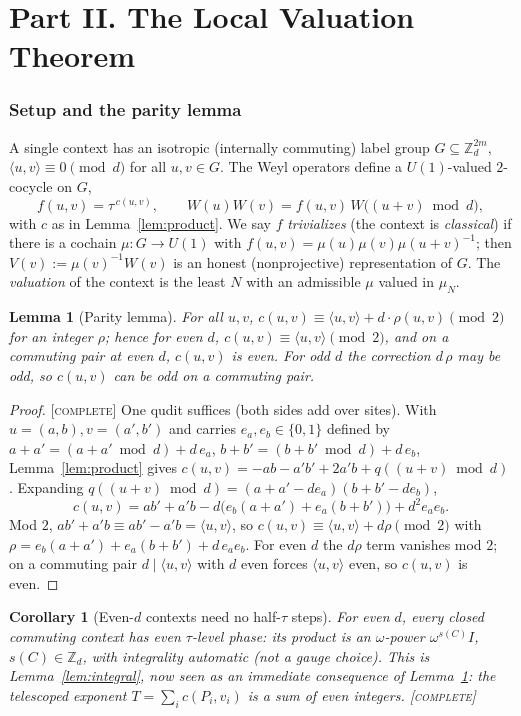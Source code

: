 \documentclass[11pt]{article}
\newtheorem{lemma}[theorem]{Lemma}
\newtheorem{corollary}[theorem]{Corollary}
\theoremstyle{definition}
\theoremstyle{remark}
\newcommand{\Z}{\mathbb{Z}}
\newcommand{\Zd}{\Z_d}
\newcommand{\ip}[2]{\langle #1,#2\rangle}
\newcommand{\CO}{\textnormal{\textsc{[complete]}}}
\begin{document}
\part*{Part II. The Local Valuation Theorem}

\section{Setup and the parity lemma}\label{sec:localsetup}

A single context has an isotropic (internally commuting) label group $G\subseteq\Zd^{2m}$,
$\ip{u}{v}\equiv0\pmod d$ for all $u,v\in G$. The Weyl operators define a $U(1)$-valued $2$-cocycle
on $G$,
\[
f(u,v)=\tau^{\,c(u,v)},\qquad W(u)W(v)=f(u,v)\,W\bigl((u+v)\bmod d\bigr),
\]
with $c$ as in Lemma~\ref{lem:product}. We say $f$ \emph{trivializes} (the context is
\emph{classical}) if there is a cochain $\mu:G\to U(1)$ with $f(u,v)=\mu(u)\mu(v)\mu(u+v)^{-1}$;
then $V(v):=\mu(v)^{-1}W(v)$ is an honest (nonprojective) representation of $G$. The
\emph{valuation} of the context is the least $N$ with an admissible $\mu$ valued in $\mu_N$.

\begin{lemma}[Parity lemma]\label{lem:parity}
For all $u,v$, $c(u,v)\equiv\ip{u}{v}+d\cdot\rho(u,v)\pmod2$ for an integer $\rho$; hence for even $d$,
$c(u,v)\equiv\ip{u}{v}\pmod2$, and on a commuting pair at even $d$, $c(u,v)$ is even. For odd $d$ the
correction $d\,\rho$ may be odd, so $c(u,v)$ can be odd on a commuting pair.
\end{lemma}
\begin{proof}
\CO{} One qudit suffices (both sides add over sites). With $u=(a,b),v=(a',b')$ and carries
$e_a,e_b\in\{0,1\}$ defined by $a+a'=(a+a'\bmod d)+d\,e_a$, $b+b'=(b+b'\bmod d)+d\,e_b$,
Lemma~\ref{lem:product} gives $c(u,v)=-ab-a'b'+2a'b+q((u+v)\bmod d)$. Expanding
$q((u+v)\bmod d)=(a+a'-de_a)(b+b'-de_b)$,
\[
c(u,v)=ab'+a'b-d\bigl(e_b(a+a')+e_a(b+b')\bigr)+d^2e_ae_b .
\]
Mod $2$, $ab'+a'b\equiv ab'-a'b=\ip{u}{v}$, so $c(u,v)\equiv\ip{u}{v}+d\rho\pmod2$ with
$\rho=e_b(a+a')+e_a(b+b')+d\,e_ae_b$. For even $d$ the $d\rho$ term vanishes mod $2$; on a commuting
pair $d\mid\ip{u}{v}$ with $d$ even forces $\ip{u}{v}$ even, so $c(u,v)$ is even.
\end{proof}

\begin{corollary}[Even-$d$ contexts need no half-$\tau$ steps]\label{cor:noHalfTau}
For even $d$, every closed commuting context has \emph{even} $\tau$-level phase: its product is an
$\omega$-power $\omega^{s(C)}I$, $s(C)\in\Zd$, with integrality automatic (not a gauge choice). This
is Lemma~\ref{lem:integral}, now seen as an immediate consequence of Lemma~\ref{lem:parity}: the
telescoped exponent $T=\sum_i c(P_i,v_i)$ is a sum of even integers. \CO
\end{corollary}
\end{document}
